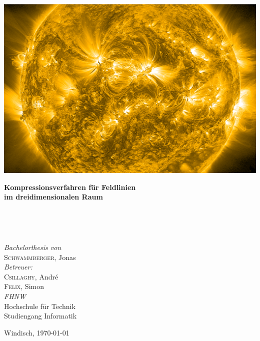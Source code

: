 
\thispagestyle{titlestyle}

\includegraphics[width=1\textwidth]{./pictures/title3.png}\\

\begin{onehalfspace}
\begin{huge}
\textbf{Kompressionsverfahren für Feldlinien \\im dreidimensionalen Raum}
\end{huge}
\vspace{0.1cm}\\
\begin{Large}
\end{Large}
\vspace{0.8cm}\\
\begin{large}
\emph{Bachelorthesis von}\\
\textsc{Schwammberger}, Jonas\vspace{0.8cm}\\
\emph{Betreuer:}\\
\textsc{Csillaghy}, André\\
\textsc{Felix}, Simon\vspace{0.8cm}\\
\emph{FHNW}\\
Hochschule für Technik\\
Studiengang Informatik\vspace{0.8cm}\\
\end{large}
\end{onehalfspace}
\vfill
\begin{normalsize}
Windisch, \today
\end{normalsize}
\pagebreak